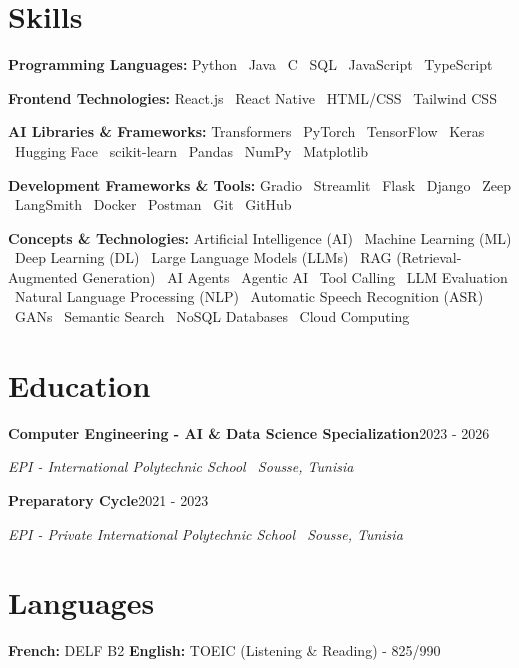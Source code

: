 \documentclass[11pt,a4paper]{article}
\newcommand{\entry}[2]{\textbf{#1}\hfill{\small\color{muted}#2}\par}
\newcommand{\org}[1]{{\itshape\color{muted}#1}\par}
\begin{document}
\section{Skills}
\textbf{\color{accent}Programming Languages:} Python \textperiodcentered\ Java \textperiodcentered\ C \textperiodcentered\ SQL \textperiodcentered\ JavaScript \textperiodcentered\ TypeScript\par
\smallskip
\textbf{\color{accent}Frontend Technologies:} React.js \textperiodcentered\ React Native \textperiodcentered\ HTML/CSS \textperiodcentered\ Tailwind CSS\par
\smallskip
\textbf{\color{accent}AI Libraries \& Frameworks:} Transformers \textperiodcentered\ PyTorch \textperiodcentered\ TensorFlow \textperiodcentered\ Keras \textperiodcentered\ Hugging Face \textperiodcentered\ scikit-learn \textperiodcentered\ Pandas \textperiodcentered\ NumPy \textperiodcentered\ Matplotlib\par
\smallskip
\textbf{\color{accent}Development Frameworks \& Tools:} Gradio \textperiodcentered\ Streamlit \textperiodcentered\ Flask \textperiodcentered\ Django \textperiodcentered\ Zeep \textperiodcentered\ LangSmith \textperiodcentered\ Docker \textperiodcentered\ Postman \textperiodcentered\ Git \textperiodcentered\ GitHub\par
\smallskip
\textbf{\color{accent}Concepts \& Technologies:} Artificial Intelligence (AI) \textperiodcentered\ Machine Learning (ML) \textperiodcentered\ Deep Learning (DL) \textperiodcentered\ Large Language Models (LLMs) \textperiodcentered\ RAG (Retrieval-Augmented Generation) \textperiodcentered\ AI Agents \textperiodcentered\ Agentic AI \textperiodcentered\ Tool Calling \textperiodcentered\ LLM Evaluation \textperiodcentered\ Natural Language Processing (NLP) \textperiodcentered\ Automatic Speech Recognition (ASR) \textperiodcentered\ GANs \textperiodcentered\ Semantic Search \textperiodcentered\ NoSQL Databases \textperiodcentered\ Cloud Computing\par

\section{Education}
\entry{Computer Engineering - AI \& Data Science Specialization}{2023 - 2026}
\org{EPI - International Polytechnic School \textperiodcentered\ Sousse, Tunisia}
\vspace{3pt}

\entry{Preparatory Cycle}{2021 - 2023}
\org{EPI - Private International Polytechnic School \textperiodcentered\ Sousse, Tunisia}

\section{Languages}
\textbf{\color{accent}French:} DELF B2 \qquad
\textbf{\color{accent}English:} TOEIC (Listening \& Reading) - 825/990
\end{document}
